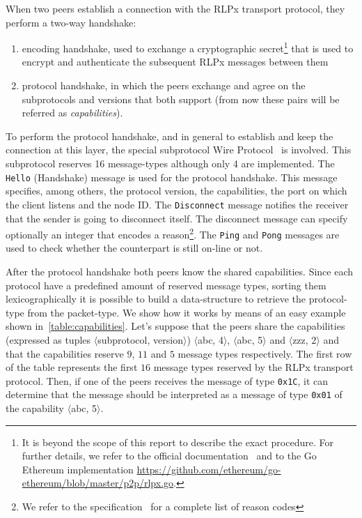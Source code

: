 When two peers establish a connection with the RLPx transport protocol, they
perform a two-way handshake:
\begin{enumerate}
  \item encoding handshake, used to exchange a cryptographic secret\footnote{It
  is beyond the scope of this report to describe the exact procedure. For
  further details, we refer to the official documentation~\cite{rlpx} and to the
  Go Ethereum implementation
  \url{https://github.com/ethereum/go-ethereum/blob/master/p2p/rlpx.go}.}
  that is used to encrypt and authenticate the subsequent RLPx messages between
  them
  \item protocol handshake, in which the peers exchange and agree on the
  subprotocols and versions that both support (from now these pairs will be
  referred as \emph{capabilities}).
\end{enumerate}

To perform the protocol handshake, and in general to establish and keep the
connection at this layer, the special subprotocol \devpp{} Wire
Protocol~\cite{devp2pwire} is involved. This subprotocol reserves 16
message-types although only 4 are implemented. The \verb+Hello+ (Handshake)
message is used for the protocol handshake. This message specifies, among
others, the protocol version, the capabilities, the port on which the client
listens and the node ID. The \verb+Disconnect+ message notifies the receiver
that the sender is going to disconnect itself. The disconnect message can
specify optionally an integer that encodes a reason\footnote{We refer to the
\devpp{} specification~\cite{devp2pwire} for a complete list of reason codes}.
The \verb+Ping+ and \verb+Pong+ messages are used to check whether the
counterpart is still on-line or not.

After the protocol handshake both peers know the shared capabilities. Since each
protocol have a predefined amount of reserved message types, sorting them
lexicographically it is possible to build a data-structure to retrieve the
protocol-type from the packet-type. We show how it works by means of an easy
example shown in~\autoref{table:capabilities}. Let's suppose that the peers
share the capabilities (expressed as tuples $\langle$subprotocol,
version$\rangle$) $\langle$abc, 4$\rangle$, $\langle$abc, 5$\rangle$ and
$\langle$zzz, 2$\rangle$ and that the capabilities reserve $9$, $11$ and $5$
message types respectively. The first row of the table represents the first $16$
message types reserved by the RLPx transport protocol. Then, if one of the peers
receives the message of type \texttt{0x1C}, it can determine that the message
should be interpreted as a message of type \texttt{0x01} of the capability
$\langle$abc, 5$\rangle$.

